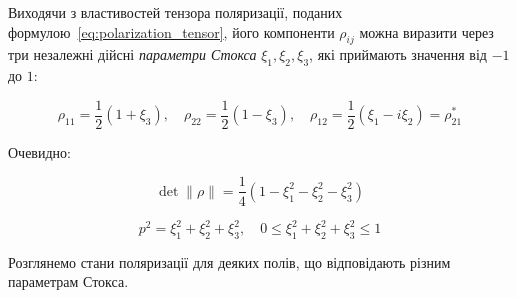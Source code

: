 Виходячи з властивостей тензора поляризації, поданих формулою~\eqref{eq:polarization_tensor}, його компоненти
\(\rho_{ij}\) можна виразити через три незалежні дійсні \emph{параметри Стокса} \(\xi_1, \xi_2,
\xi_3\), які приймають значення від $-1$ до $1$:

\begin{equation*}
	\rho_{11} = \frac{1}{2} \left( 1 + \xi_3 \right), \quad \rho_{22} = \frac{1}{2} \left( 1 - \xi_3 \right), \quad \rho_{12} = \frac{1}{2} \left( \xi_1 -
	i\xi_2 \right) = \rho_{21}^{*}
\end{equation*}

Очевидно:

\begin{equation*}
	\det \|\rho\| = \frac{1}{4} \left( 1 - \xi_1^2 - \xi_2^2 - \xi_3^2 \right)
\end{equation*}

\begin{equation*}
	p^2 = \xi_1^2 + \xi_2^2 + \xi_3^2, \quad 0 \leqslant \xi_1^2 + \xi_2^2 + \xi_3^2 \leqslant 1
\end{equation*}

Розглянемо стани поляризації для деяких полів, що відповідають різним параметрам Стокса.


